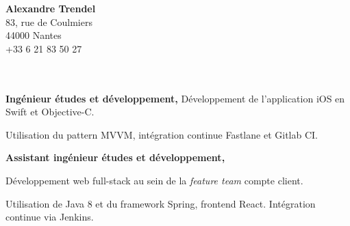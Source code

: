 \documentclass{cv}
\begin{document}
\pagestyle{empty}

\begin{minipage}[c]{0.6\textwidth}
\end{minipage}
\begin{minipage}[c]{0.4\textwidth}

\textbf{\large Alexandre Trendel} \\
83, rue de Coulmiers \\
44000 Nantes \\
 +33 6 21 83 50 27 \\
 \href{mailto:trendel.alexandre@gmail.com}{} \\
 \href{https://github.com/xou816}{} \\

\end{minipage}

\vspace{1cm}


\begin{mainexpbox}[title=nov. 2019]

	\begin{minipage}[c]{20mm}
	\end{minipage}
	\begin{minipage}[c]{0.8\textwidth}

	\textbf{Ingénieur études et développement, \evtech{}} \newline
	Développement de l'application iOS \href{https://apps.apple.com/fr/app/oui-sncf-train-et-bus/id343889987}{} en Swift et Objective-C. 

	Utilisation du pattern MVVM, intégration continue Fastlane et Gitlab CI.
	\end{minipage}

\end{mainexpbox}

\begin{expbox}[title={déc. 2016, \faicon{clock-o} 3 ans}]

	\begin{minipage}[c]{20mm}
	\end{minipage}
	\begin{minipage}[c]{0.8\textwidth}

	\textbf{Assistant ingénieur études et développement, \evtech{}}

	Développement web full-stack au sein de la \textit{feature team} compte client.

	Utilisation de Java 8 et du framework Spring, frontend React. Intégration continue via Jenkins.
	\end{minipage}

\end{expbox}
\end{document}
